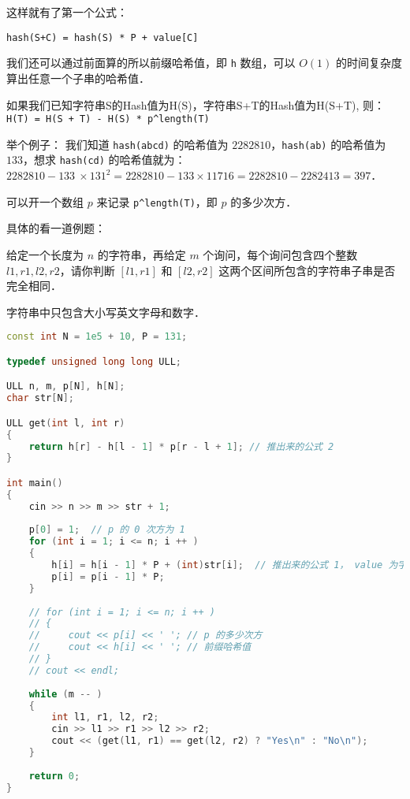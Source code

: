 这样就有了第一个公式：

\verb|hash(S+C) = hash(S) * P + value[C]|

我们还可以通过前面算的所以前缀哈希值，即 \verb|h| 数组，可以 $O(1)$ 的时间复杂度算出任意一个子串的哈希值．

如果我们已知字符串S的Hash值为H(S)，字符串S+T的Hash值为H(S+T),
则：\verb|H(T) = H(S + T) - H(S) * p^length(T)|

举个例子：
我们知道 \verb|hash(abcd)| 的哈希值为 $2282810$，\verb|hash(ab)| 的哈希值为 $133$，想求 \verb|hash(cd)| 的哈希值就为：
$2282810 - 133\  \times 131^2 = 2282810 - 133 \times 11716 = 2282810 - 2282413 = 397$．

可以开一个数组 $p$ 来记录 \verb|p^length(T)|，即 $p$ 的多少次方．

具体的看一道例题：

给定一个长度为 $n$ 的字符串，再给定 $m$ 个询问，每个询问包含四个整数 $l1,r1,l2,r2$，请你判断 $[l1,r1]$ 和 $[l2,r2]$ 这两个区间所包含的字符串子串是否完全相同．

字符串中只包含大小写英文字母和数字．

\begin{lstlisting}[language=cpp]
const int N = 1e5 + 10, P = 131;

typedef unsigned long long ULL;

ULL n, m, p[N], h[N];
char str[N];

ULL get(int l, int r)
{
    return h[r] - h[l - 1] * p[r - l + 1]; // 推出来的公式 2
}

int main()
{
    cin >> n >> m >> str + 1;
    
    p[0] = 1;  // p 的 0 次方为 1
    for (int i = 1; i <= n; i ++ )
    {
        h[i] = h[i - 1] * P + (int)str[i];  // 推出来的公式 1， value 为字符的 ASCII
        p[i] = p[i - 1] * P;
    }
    
    // for (int i = 1; i <= n; i ++ )
    // {
    //     cout << p[i] << ' '; // p 的多少次方
    //     cout << h[i] << ' '; // 前缀哈希值
    // }
    // cout << endl;
    
    while (m -- )
    {
        int l1, r1, l2, r2;
        cin >> l1 >> r1 >> l2 >> r2;
        cout << (get(l1, r1) == get(l2, r2) ? "Yes\n" : "No\n");
    }
    
    return 0;
}

\end{lstlisting}
